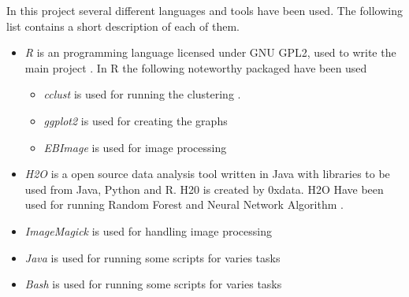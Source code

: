 In this project several different languages and tools have been used. The following list contains a short description of each of them. 

\begin{itemize}
	\item \textit{R} is an programming language licensed under GNU GPL2, used to write the main project \citealp{RLanguage}. In R the following noteworthy packaged have been used
		\begin{itemize}
			\item \textit{cclust} is used for running the clustering \cite{cclust}.
			\item \textit{ggplot2} is used for creating the graphs
			\item \textit{EBImage} is used for image processing \cite{EBI}
		\end{itemize}
	\item \textit{H2O} is a open source data analysis tool written in Java with libraries to be used from Java, Python and R. H20 is created by 0xdata. H2O Have been used for running Random Forest and Neural Network Algorithm \cite{H2O}.
	\item \textit{ImageMagick} is used for handling image processing \cite{ImgMag}
	\item \textit{Java} is used for running some scripts for varies tasks
	\item \textit{Bash} is used for running some scripts for varies tasks
\end{itemize}
